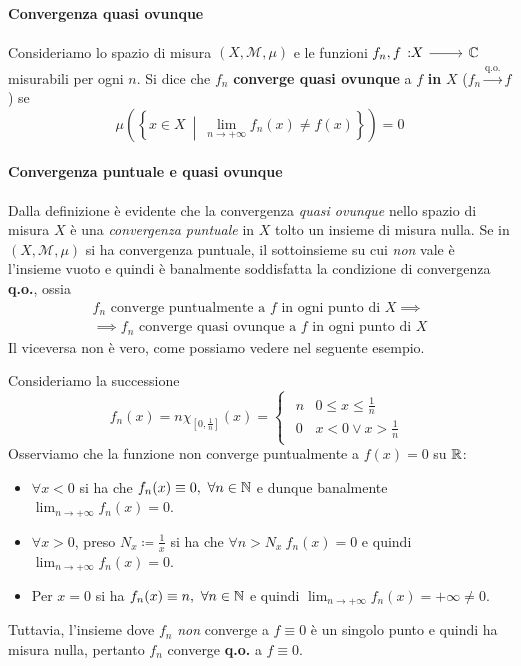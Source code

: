 \paragraph{Convergenza quasi ovunque}
\begin{define}
	Consideriamo lo spazio di misura $\left(X,\mathcal{M},\mu\right)$ e le funzioni $\funz{f_n,f}{X}{\complexset}$ misurabili per ogni $n$. Si dice che
	$f_n$ \textbf{converge quasi ovunque} a $f$ \textbf{in} $X$ ($f_n\overset{\text{q.o.}}{\to} f$) se
	\begin{equation}
		\mu\left(\left\{x\in X \ \middle| \  \lim_{n\to+\infty}f_n(x)\neq f(x)\right\}\right)=0
	\end{equation}
\end{define}
\paragraph{Convergenza puntuale e quasi ovunque}
Dalla definizione è evidente che la convergenza \textit{quasi ovunque} nello spazio di misura $X$ è una \textit{convergenza puntuale} in $X$ tolto un insieme di misura nulla. Se in $\left(X,\mathcal{M},\mu\right)$ si ha convergenza puntuale, il sottoinsieme su cui \textit{non} vale è l'insieme vuoto e quindi è banalmente soddisfatta la condizione di convergenza \textbf{q.o.}, ossia
\begin{multline}
	f_n\text{ converge puntualmente a }f\text{ in ogni punto di }X\implies\\
	\implies f_n\text{ converge quasi ovunque a }f\text{ in ogni punto di }X
\end{multline}
Il viceversa non è vero, come possiamo vedere nel seguente esempio.
\begin{example}
	Consideriamo la successione
	\begin{equation*}
		f_n(x)=n\chi_{\left[0,\frac{1}{n}\right]}(x)=
		\begin{cases}
			\begin{array}{ll}
				n&0\leq x\leq\frac{1}{n}\\
				0&x< 0\vee x>\frac{1}{n}
			\end{array}
		\end{cases}
	\end{equation*}
	Osserviamo che la funzione non converge puntualmente a $f(x)=0$ su $\mathbb{R}$:
	\begin{itemize}
		\item $\forall x< 0$ si ha che $f_n(x)\equiv 0,\ \forall n\in\mathbb{N}$ e dunque banalmente $\displaystyle\lim_{n\to+\infty}f_n(x)=0$.
		\item $\forall x>0$, preso $N_x\coloneqq\frac{1}{x}$ si ha che $\forall n>N_x\ f_n(x)=0$ e quindi $\displaystyle\lim_{n\to+\infty}f_n(x)=0$.
		\item Per $x=0$ si ha $f_n(x)\equiv n,\ \forall n\in\mathbb{N}$ e quindi $\displaystyle\lim_{n\to+\infty}f_n(x)=+\infty\neq0$.
	\end{itemize}
Tuttavia, l'insieme dove $f_n$ \textit{non} converge a $f\equiv0$ è un singolo punto e quindi ha misura nulla, pertanto $f_n$ converge \textbf{q.o.} a $f\equiv 0$.
\end{example}
